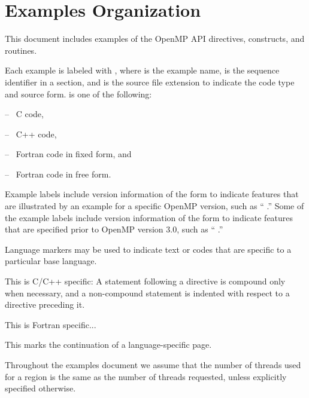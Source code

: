 \section{Examples Organization}
\label{chap:examples}
\label{sec:examples}

This document includes examples of the OpenMP API directives, constructs, and routines.

Each example is labeled with , where  is 
the example name,  is the sequence identifier in a section, and 
 is the source file extension to indicate the code type and 
source form.   is one of the following:
\begin{description}[noitemsep,labelindent=5mm,widest=f90]
\item[\plc{c}] -- \ C code,
\item[\plc{cpp}] -- \ C++ code,
\item[\plc{f}] -- \ Fortran code in fixed form, and
\item[\plc{f90}] -- \ Fortran code in free form.
\end{description}

Example labels include version information of the form
 to indicate features that are illustrated
by an example for a specific OpenMP version, such as 
`` \;.''
Some of the example labels include version information of the form
 to indicate features that are specified 
prior to OpenMP version 3.0, such as
`` \;.''

Language markers may be used to indicate text or codes that are specific 
to a particular base language.
\begin{ccppspecific}
This is C/C++ specific: 
A statement following a directive is compound only when necessary, and a 
non-compound statement is indented with respect to a directive preceding it.
\end{ccppspecific}
\begin{fortranspecific}
This is Fortran specific...
\end{fortranspecific}
This marks the continuation of a language-specific page.

\medskip
Throughout the examples document we assume that the number of threads 
used for a  region is the same as 
the number of threads requested, unless explicitly specified otherwise.

